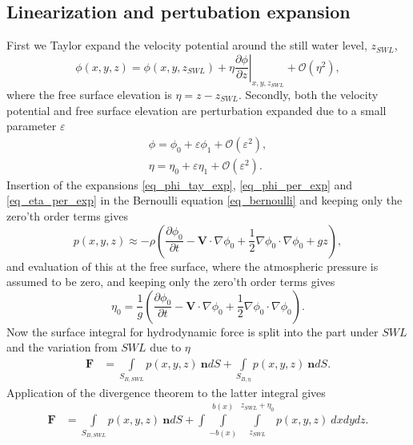 \documentclass[A4paper,11pt]{marine_2023_Paper}
\newcommand{\V}[1]{\boldsymbol{#1}}
\newcommand{\D}[2]{\frac{\partial #1}{\partial #2}}
\begin{document}
\subsection{Linearization and pertubation expansion}
First we Taylor expand the velocity potential around the still water level, $z_{SWL}$,
\begin{equation}
	\phi(x,y,z) = \phi(x,y,z_{SWL}) + \eta \left.\D{\phi}{z}\right|_{x,y,z_{SWL}} + \mathcal{O}(\eta^2),
	\label{eq_phi_tay_exp}
\end{equation}
where the free surface elevation is $\eta = z-z_{SWL}$. Secondly, both the velocity potential and free surface elevation are perturbation expanded due to a small parameter $\varepsilon$
\begin{align}
	\phi = \phi_0 + \varepsilon \phi_1 + \mathcal{O}(\varepsilon^2), \label{eq_phi_per_exp} \\
	\eta = \eta_0 + \varepsilon \eta_1 + \mathcal{O}(\varepsilon^2).\label{eq_eta_per_exp}
\end{align}
Insertion of the expansions \eqref{eq_phi_tay_exp}, \eqref{eq_phi_per_exp} and \eqref{eq_eta_per_exp} in the Bernoulli equation \eqref{eq_bernoulli} and keeping only the zero'th order terms gives
\begin{equation}
	p(x, y, z) \approx -\rho \left(\D{\phi_0}{t} -\V{V} \cdot \nabla \phi_0 + \frac{1}{2} \nabla \phi_0 \cdot \nabla \phi_0 + gz \right),
\end{equation}
and evaluation of this at the free surface, where the atmospheric pressure is assumed to be zero, and keeping only the zero'th order terms gives
\begin{equation}
	\eta_0 =  \frac{1}{g} \left(\D{\phi_0}{t} -\V{V} \cdot \nabla \phi_0 + \frac{1}{2} \nabla \phi_0 \cdot \nabla \phi_0\right).
\end{equation}
Now the surface integral for hydrodynamic force is split into the part under $SWL$ and the variation from $SWL$ due to $\eta$
\begin{align}
	\V{F} &= \int\limits_{S_{B,SWL}} p(x, y, z) ~\V{n} dS + \int\limits_{S_{B,\eta}} p(x, y, z) ~\V{n} dS.
\end{align}
Application of the divergence theorem to the latter integral gives
\begin{align}
	\V{F} &= \int\limits_{S_{B,SWL}} p(x, y, z) ~\V{n} dS + \int \int\limits_{-b(x)}^{b(x)} \int\limits_{z_{SWL}}^{z_{SWL}+\eta_0} p(x, y, z) ~ dxdydz.
\end{align}
\end{document}
